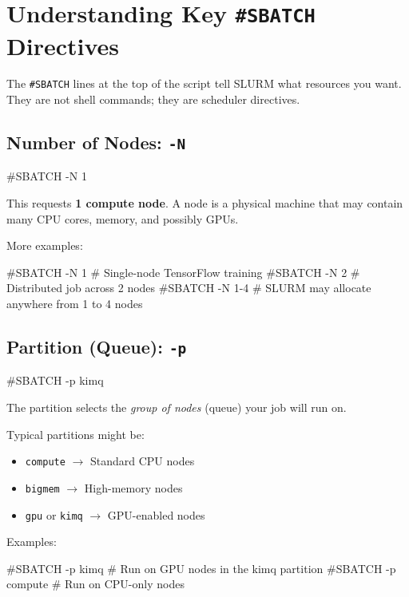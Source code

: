 \documentclass[11pt]{article}
\begin{document}
\section{Understanding Key \texttt{\#SBATCH} Directives}
\label{sec:sbatch-directives}

The \texttt{\#SBATCH} lines at the top of the script tell SLURM what resources you want. They are not shell commands; they are scheduler directives.

\subsection{Number of Nodes: \texttt{-N}}

\begin{codeblock}
#SBATCH -N 1
\end{codeblock}

This requests \textbf{1 compute node}. A node is a physical machine that may contain many CPU cores, memory, and possibly GPUs.

More examples:\\
\begin{codeblock}
#SBATCH -N 1        # Single-node TensorFlow training
#SBATCH -N 2        # Distributed job across 2 nodes
#SBATCH -N 1-4      # SLURM may allocate anywhere from 1 to 4 nodes
\end{codeblock}

\subsection{Partition (Queue): \texttt{-p}}

\begin{codeblock}
#SBATCH -p kimq
\end{codeblock}

The partition selects the \emph{group of nodes} (queue) your job will run on.

Typical partitions might be:
\begin{itemize}
  \item \texttt{compute} $\rightarrow$ Standard CPU nodes
  \item \texttt{bigmem} $\rightarrow$ High-memory nodes
  \item \texttt{gpu} or \texttt{kimq} $\rightarrow$ GPU-enabled nodes
\end{itemize}

Examples:\\
\begin{codeblock}
#SBATCH -p kimq     # Run on GPU nodes in the kimq partition
#SBATCH -p compute  # Run on CPU-only nodes
\end{codeblock}
\end{document}
